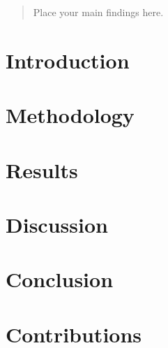 \documentclass{article}
\begin{document}


\begin{abstract}
Place your main findings here.
\end{abstract}

\section{Introduction}

\section{Methodology}

\section{Results}

\section{Discussion}

\section{Conclusion}

\section{Contributions}



\end{document}
